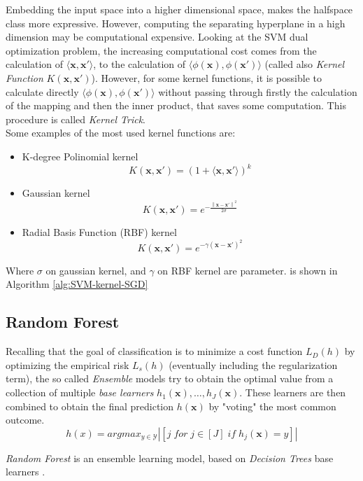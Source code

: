 Embedding the input space into a higher dimensional space, makes the halfspace class more expressive. However, computing the separating hyperplane in a high dimension may be computational expensive. Looking at the SVM dual optimization problem, the increasing computational cost comes from the calculation of $\langle \mathbf{x}, \mathbf{x}' \rangle$, to the calculation of $\langle \phi(\mathbf{x}), \phi(\mathbf{x}') \rangle$ (called also \textit{Kernel Function} $K(\mathbf{x}, \mathbf{x}')$). However, for some kernel functions, it is possible to calculate directly $\langle \phi(\mathbf{x}), \phi(\mathbf{x}') \rangle$ without passing through firstly the calculation of the mapping and then the inner product, that saves some computation. This procedure is called \textit{Kernel Trick}.\\
Some examples of the  most used kernel functions are:
\begin{itemize}
	\item K-degree Polinomial kernel
	\[K(\mathbf{x}, \mathbf{x}') = (1 + \langle \mathbf{x}, \mathbf{x}' \rangle)^k\]
	\item Gaussian kernel 
	\[K(\mathbf{x}, \mathbf{x}') = e^{- \frac{\left\lVert \mathbf{x} - \mathbf{x}' \right\rVert^2}{2 \sigma}} \]
	\item Radial Basis Function (RBF) kernel
	\[K(\mathbf{x}, \mathbf{x}') = e^{- \gamma \left( \mathbf{x} - \mathbf{x}' \right)^2} \]
\end{itemize}
Where $\sigma$ on gaussian kernel, and $\gamma$ on RBF kernel are parameter. is shown in Algorithm \ref{alg:SVM-kernel-SGD}


\subsection{Random Forest}

Recalling that the goal of classification is to minimize a cost function $L_D(h)$ by optimizing the empirical risk $L_s(h)$ (eventually including the regularization term), the so called \textit{Ensemble} models try to obtain the optimal value from a collection of multiple \textit{base learners} $h_1(\mathbf{x}), \dots, h_J(\mathbf{x})$. These learners are then combined to obtain the final prediction $h(\mathbf{x})$ by "voting" the most common outcome.
\[ h(x) = argmax_{y \in \mathcal{Y}} |[j \; for \; j \in [J] \; if \; h_j(\mathbf{x}) = y]| \] 

\textit{Random Forest} is an ensemble learning model, based on \textit{Decision Trees} base learners \cite{inbook}.

